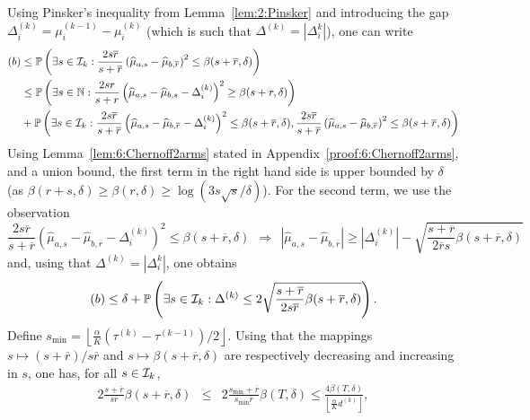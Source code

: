 Using Pinsker's inequality from Lemma~\ref{lem:2:Pinsker} and introducing the gap $\Delta_i^{(k)} = \mu_i^{(k-1)} - {\mu}_i^{(k)}$ (which is such that $\Delta^{(k)} = |\Delta_i^k|$), one can write
%
\begin{align}
    (b) & \leq \mathbb{P}\left(\exists s \in \mathcal{I}_k : \frac{2s\overline{r}}{s+\overline{r}}\left(\widehat{\mu}_{a,s} - \widehat{\mu}_{b,\overline{r}} \right)^2  \leq \beta(s+\overline{r},\delta)\right)\nonumber\\
    & \leq \mathbb{P}\left(\exists s \in \mathbb{N} : \frac{2sr}{s+r}\left(\widehat{\mu}_{a,s} - \widehat{\mu}_{b,s} - \Delta_i^{(k)}\right)^2  \geq \beta(s+r,\delta)\right) \nonumber\\
    & + \mathbb{P}\left(\exists s \in \mathcal{I}_k : \frac{2s\overline{r}}{s+\overline{r}}\left(\widehat{\mu}_{a,s} - \widehat{\mu}_{b,\overline{r}} - \Delta_i^{(k)}\right)^2  \leq \beta(s+\overline{r},\delta), \frac{2s\overline{r}}{s+\overline{r}}\left(\widehat{\mu}_{a,s} - \widehat{\mu}_{b,\overline{r}}\right)^2  \leq \beta(s+\overline{r},\delta)\right) \nonumber
\end{align}
%
Using Lemma~\ref{lem:6:Chernoff2arms} stated in Appendix~\ref{proof:6:Chernoff2arms}, and a union bound, the first term in the right hand side is upper bounded by $\delta$ (as $\beta(r+s,\delta) \geq \beta(r,\delta) \geq \log(3s\sqrt{s}/\delta)$). For the second term, we use the observation
\[\frac{2s\overline{r}}{s+\overline{r}}\left(\widehat{\mu}_{a,s} - \widehat{\mu}_{b,\overline{r}} - \Delta_i^{(k)}\right)^2  \leq \beta(s+\overline{r},\delta) \ \ \Rightarrow \ \ |\widehat{\mu}_{a,s} - \widehat{\mu}_{b,\overline{r}}| \geq |\Delta_i^{(k)}| - \sqrt{\frac{s+\overline{r}}{2\overline{r}s}\beta(s+\overline{r},\delta)}\]
and, using that $\Delta^{(k)} = |\Delta_i^k|$, one obtains
%
\begin{equation}\label{eq:6:FromHereGlobal}
    (b) \leq \delta + \mathbb{P}\left(\exists s \in \mathcal{I}_k : \Delta^{(k)} \leq 2\sqrt{\frac{s+\overline{r}}{2s\overline{r}}\beta(s+\overline{r},\delta)}\right).
\end{equation}
%
Define $s_{\min} = \left\lfloor \frac{\alpha}{K} (\tau^{(k)}-\tau^{(k-1)})/2\right\rfloor$. Using that the mappings $s \mapsto (s+\overline{r})/s\overline{r}$ and $s \mapsto \beta(s + \overline{r},\delta)$ are respectively decreasing and increasing in $s$, one has, for all $s\in \mathcal{I}_k$,
\begin{eqnarray*}
    2\frac{s+\overline{r}}{s\overline{r}}\beta\left(s+\overline{r}, \delta\right) & \leq &
    2\frac{s_{\min}+\overline{r}}{s_{\min}\overline{r}}\beta\left(T, \delta\right) \leq \frac{4\beta(T,\delta)}{\left\lfloor \frac{\alpha}{K}d^{(k)}\right\rfloor},
\end{eqnarray*}
